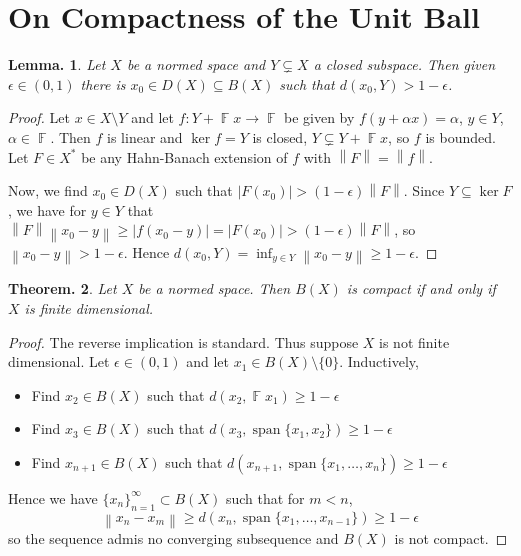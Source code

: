 \documentclass[11pt, a4paper]{memoir}
\DeclareMathOperator{\F}{{\mathbb{F}}}
\newcommand{\norm}[1]{\ensuremath{\left\lVert#1\right\rVert}}
\theoremstyle{change}
\newtheorem{theorem}{Theorem.}[section]
\newtheorem{lemma}[theorem]{Lemma.}
\theoremstyle{plain}
\theoremstyle{nonumberplain}
\newtheorem{proof}{Proof}
\DeclareMathOperator{\spn}{span}
\numberwithin{equation}{section}
\begin{document}
\section{On Compactness of the Unit Ball}
\begin{lemma}
    Let $X$ be a normed space and $Y\subsetneq X$ a closed subspace.
    Then given $\epsilon\in(0,1)$ there is $x_0\in D(X)\subseteq B(X)$ such that $d(x_0,Y)>1-\epsilon$.
\end{lemma}
\begin{proof}
    Let $x\in X\setminus Y$ and let $f:Y+\F x\to\F$ be given by $f(y+\alpha x)=\alpha$, $y\in Y$, $\alpha\in \F$.
    Then $f$ is linear and $\ker f=Y$ is closed, $Y\subsetneq Y+\F x$, so $f$ is bounded.
    Let $F\in X^*$ be any Hahn-Banach extension of $f$ with $\norm{F}=\norm{f}$.

    Now, we find $x_0\in D(X)$ such that $|F(x_0)|>(1-\epsilon)\norm{F}$.
    Since $Y\subseteq\ker F$, we have for $y\in Y$ that $\norm{F}\norm{x_0-y}\geq|f(x_0-y)|=|F(x_0)|>(1-\epsilon)\norm{F}$, so $\norm{x_0-y}>1-\epsilon$.
    Hence $d(x_0,Y)=\inf_{y\in Y}\norm{x_0-y}\geq 1-\epsilon$.
\end{proof}
\begin{theorem}
    Let $X$ be a normed space.
    Then $B(X)$ is compact if and only if $X$ is finite dimensional.
\end{theorem}
\begin{proof}
    The reverse implication is standard.
    Thus suppose $X$ is not finite dimensional.
    Let $\epsilon\in(0,1)$ and let $x_1\in B(X)\setminus\{0\}$.
    Inductively,
    \begin{itemize}[nl,r]
        \item Find $x_2\in B(X)$ such that $d(x_2,\F x_1)\geq 1-\epsilon$
        \item Find $x_3\in B(X)$ such that $d(x_3,\spn\{x_1,x_2\})\geq 1-\epsilon$
        \item Find $x_{n+1}\in B(X)$ such that $d(x_{n+1},\spn\{x_1,\ldots,x_n\})\geq 1-\epsilon$
    \end{itemize}
    Hence we have $\{x_n\}_{n=1}^\infty\subset B(X)$ such that for $m<n$,
    \begin{equation*}
        \norm{x_n-x_m}\geq d(x_n,\spn\{x_1,\ldots,x_{n-1}\})\geq 1-\epsilon
    \end{equation*}
    so the sequence admis no converging subsequence and $B(X)$ is not compact.
\end{proof}
\end{document}
